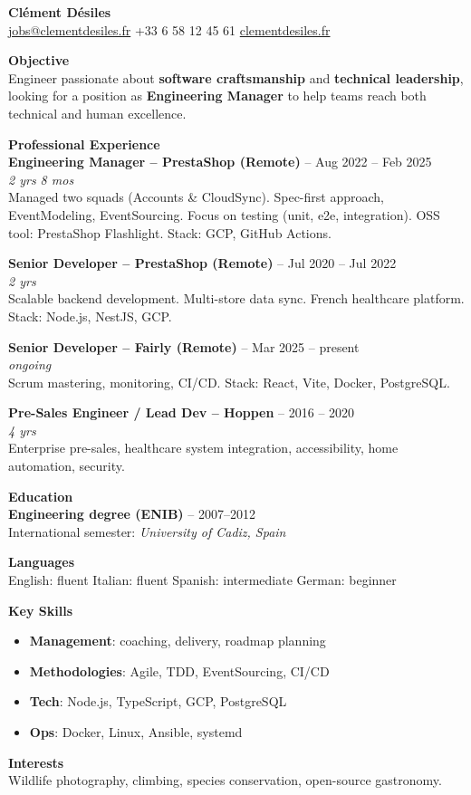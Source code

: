 \documentclass[a4paper,10pt]{article}
\newcommand{\sectiontitle}[1]{\vspace{1.2em}\textbf{\Large #1}\vspace{0.5em}\\}
\newcommand{\job}[3]{\textbf{#1} -- #2\\\textit{#3}\\}
\newcommand{\skill}[1]{\textbf{#1}}
\begin{document}
\begin{center}
    {\Huge \textbf{Clément Désiles}}\\
    \vspace{0.2cm}
    \href{mailto:jobs@clementdesiles.fr}{jobs@clementdesiles.fr} \textbullet{} +33 6 58 12 45 61 \textbullet{} \href{https://clementdesiles.fr}{clementdesiles.fr}
\end{center}

\sectiontitle{Objective}
Engineer passionate about \textbf{software craftsmanship} and \textbf{technical leadership}, looking for a position as \textbf{Engineering Manager} to help teams reach both technical and human excellence.

\sectiontitle{Professional Experience}

\job{Engineering Manager – PrestaShop (Remote)}{Aug 2022 – Feb 2025}{2 yrs 8 mos}
Managed two squads (Accounts & CloudSync). Spec-first approach, EventModeling, EventSourcing. Focus on testing (unit, e2e, integration). OSS tool: PrestaShop Flashlight. Stack: GCP, GitHub Actions.

\job{Senior Developer – PrestaShop (Remote)}{Jul 2020 – Jul 2022}{2 yrs}
Scalable backend development. Multi-store data sync. French healthcare platform. Stack: Node.js, NestJS, GCP.

\job{Senior Developer – Fairly (Remote)}{Mar 2025 – present}{ongoing}
Scrum mastering, monitoring, CI/CD. Stack: React, Vite, Docker, PostgreSQL.

\job{Pre-Sales Engineer / Lead Dev – Hoppen}{2016 – 2020}{4 yrs}
Enterprise pre-sales, healthcare system integration, accessibility, home automation, security.

\sectiontitle{Education}
\textbf{Engineering degree (ENIB)} -- 2007–2012\\
International semester: \textit{University of Cadiz, Spain}

\sectiontitle{Languages}
English: fluent \textbullet{} Italian: fluent \textbullet{} Spanish: intermediate \textbullet{} German: beginner

\sectiontitle{Key Skills}
\begin{itemize}
  \item \skill{Management}: coaching, delivery, roadmap planning
  \item \skill{Methodologies}: Agile, TDD, EventSourcing, CI/CD
  \item \skill{Tech}: Node.js, TypeScript, GCP, PostgreSQL
  \item \skill{Ops}: Docker, Linux, Ansible, systemd
\end{itemize}

\sectiontitle{Interests}
Wildlife photography, climbing, species conservation, open-source gastronomy.
\end{document}
